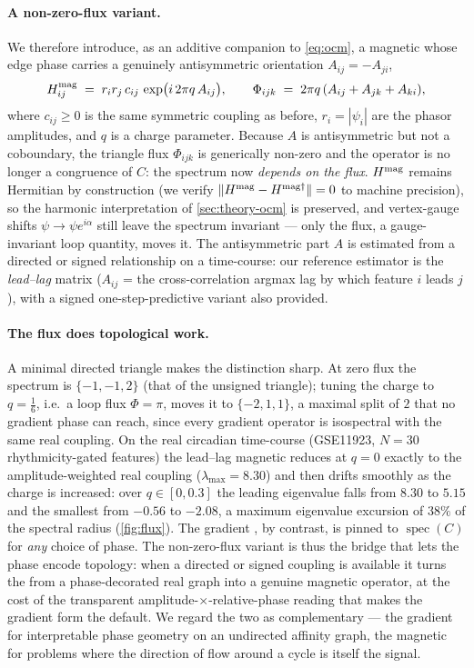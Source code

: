\paragraph{A non-zero-flux \OCM{} variant.}
We therefore introduce, as an additive companion to \cref{eq:ocm}, a magnetic
\OCM{} whose edge phase carries a genuinely antisymmetric orientation
$A_{ij}=-A_{ji}$,
\begin{equation}
  H^{\rm mag}_{ij} \;=\; r_i r_j\, c_{ij}\,
  \exp\!\big(i\,2\pi q\,A_{ij}\big),
  \qquad
  \Phi_{ijk} \;=\; 2\pi q\,(A_{ij}+A_{jk}+A_{ki}),
  \label{eq:magocm}
\end{equation}
where $c_{ij}\ge 0$ is the same symmetric coupling as before, $r_i=|\psi_i|$ are
the phasor amplitudes, and $q$ is a charge parameter. Because $A$ is
antisymmetric but not a coboundary, the triangle flux $\Phi_{ijk}$ is generically
non-zero and the operator is no longer a congruence of $C$: the spectrum now
\emph{depends on the flux}. $H^{\rm mag}$ remains Hermitian by construction
(we verify $\lVert H^{\rm mag}-H^{{\rm mag}\dagger}\rVert = 0$ to machine
precision), so the harmonic interpretation of \cref{sec:theory-ocm} is
preserved, and vertex-gauge shifts $\psi\to\psi e^{i\alpha}$ still leave the
spectrum invariant --- only the flux, a gauge-invariant loop quantity, moves it.
The antisymmetric part $A$ is estimated from a directed or signed relationship on
a time-course: our reference estimator is the \emph{lead--lag} matrix
($A_{ij}$ = the cross-correlation argmax lag by which feature $i$ leads $j$),
with a signed one-step-predictive variant also provided.

\paragraph{The flux does topological work.}
A minimal directed triangle makes the distinction sharp. At zero flux the
spectrum is $\{-1,-1,2\}$ (that of the unsigned triangle); tuning the charge to
$q=\tfrac16$, i.e.\ a loop flux $\Phi=\pi$, moves it to $\{-2,1,1\}$, a
maximal split of $2$ that no gradient phase can reach, since every gradient
operator is isospectral with the same real coupling. On the real circadian
time-course (GSE11923, $N=30$ rhythmicity-gated features) the lead--lag magnetic
\OCM{} reduces at $q=0$ exactly to the amplitude-weighted real coupling
($\lambda_{\max}=8.30$) and then drifts smoothly as the charge is increased: over
$q\in[0,0.3]$ the leading eigenvalue falls from $8.30$ to $5.15$ and the smallest
from $-0.56$ to $-2.08$, a maximum eigenvalue excursion of $38\%$ of the spectral
radius (\cref{fig:flux}). The gradient \OCM{}, by contrast, is pinned to
$\operatorname{spec}(C)$ for \emph{any} choice of phase. The non-zero-flux
variant is thus the bridge that lets the phase encode topology: when a directed
or signed coupling is available it turns the \OCM{} from a phase-decorated real
graph into a genuine magnetic operator, at the cost of the transparent
amplitude-$\times$-relative-phase reading that makes the gradient form the
default. We regard the two as complementary --- the gradient \OCM{} for
interpretable phase geometry on an undirected affinity graph, the magnetic
\OCM{} for problems where the direction of flow around a cycle is itself the
signal.

